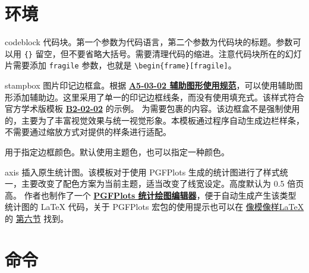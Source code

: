 \documentclass[a4paper,12pt]{article}
\begin{document}
\begin{CJK}{UTF8}{song}
\section{环境}

\begin{docEnvironment*}[doc parameter=\marg{language}\marg{title}, doclang/environment content=code]{codeblock}{}
    代码块。第一个参数为代码语言，第二个参数为代码块的标题。参数可以用 \verb"{}" 留空，但不要省略大括号。需要清理代码的缩进。注意代码块所在的幻灯片需要添加 \verb"fragile" 参数，也就是 \verb"\begin{frame}[fragile]"。
\end{docEnvironment*}

\begin{docEnvironment*}[doclang/environment content=code]{stampbox}{}
    图片印记边框盒。根据 \href{http://vi.sjtu.edu.cn/index.php/articles/base/5}{\textbf{A5-03-02 辅助图形使用规范}}，可以使用辅助图形添加辅助边。这里采用了单一的印记边框线条，而没有使用填充式。该样式符合官方学术版模板 \href{http://vi.sjtu.edu.cn/index.php/articles/app/8}{\textbf{B2-02-02}} 的示例。 为需要包裹的内容。该边框盒不是强制使用的，主要为了丰富视觉效果与统一视觉形象。本模板通过程序自动生成边栏样条，不需要通过缩放方式对提供的样条进行适配。

     用于指定边框颜色。默认使用主题色，也可以指定一种颜色。
\end{docEnvironment*}

\begin{docEnvironment*}[doclang/environment content=code]{axis}{}
    插入原生统计图。该模板对于使用 \textsf{PGFPlots} 生成的统计图进行了样式统一，主要改变了配色方案为当前主题，适当改变了线宽设定。高度默认为 0.5 倍页高。
    作者也制作了一个 \href{https://logcreative.github.io/PGFPlotsEdt/index.html?lang=cn}{\textbf{PGFPlots 统计绘图编辑器}}，便于自动生成产生该类型统计图的 \LaTeX{} 代码，关于 \textsf{PGFPlots} 宏包的使用提示也可以在 \href{https://logcreative.github.io/LaTeXSparkle/}{像模像样\LaTeX} 的 \href{https://logcreative.github.io/LaTeXSparkle/src/art/chapter06.html}{第六节} 找到。
\end{docEnvironment*}

\section{命令}


\end{CJK}
\end{document}
